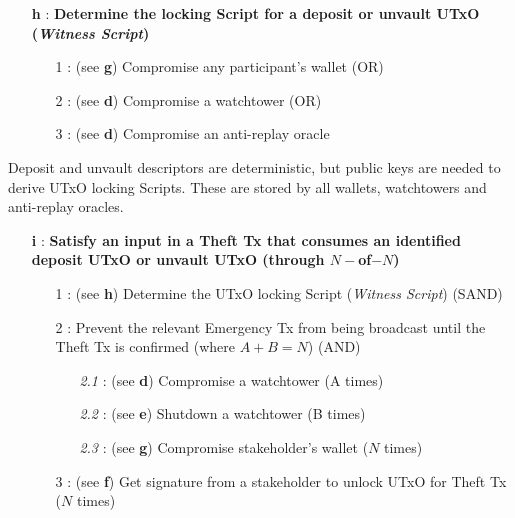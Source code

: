 \documentclass[runningheads]{llncs}
\begin{document}
{\footnotesize
\begin{itemize}[noitemsep,parsep=0pt,partopsep=0pt, leftmargin=0.7cm]
\item[\textbf{h} :] \textbf{Determine the locking Script for a deposit or unvault UTxO (\textit{Witness Script})}
\begin{itemize}[noitemsep,topsep=0pt,parsep=0pt,partopsep=0pt, leftmargin=0.8cm]
\item[1 :] (see \textbf{g}) Compromise any participant's wallet (OR)
\item[2 :] (see \textbf{d}) Compromise a watchtower (OR)
\item[3 :] (see \textbf{d}) Compromise an anti-replay oracle
\end{itemize}
\end{itemize}
}

\noindent Deposit and unvault descriptors are deterministic, but public keys are needed to derive UTxO locking Scripts. These are stored by all wallets, watchtowers and anti-replay oracles.

{\footnotesize
\begin{itemize}[noitemsep,parsep=0pt,partopsep=0pt, leftmargin=0.7cm]
\item[\textbf{i} :] \textbf{Satisfy an input in a Theft Tx that consumes an identified deposit UTxO or unvault UTxO (through $N-$of$-N$)}
\begin{itemize}[noitemsep,topsep=0pt,parsep=0pt,partopsep=0pt, leftmargin=0.8cm]
\item[1 :] (see \textbf{h}) Determine the UTxO locking Script (\textit{Witness Script}) (SAND)
\item[2 :] Prevent the relevant Emergency Tx from being broadcast until the Theft Tx is confirmed (where $A + B = N$) (AND)
\begin{itemize}[noitemsep,topsep=0pt,parsep=0pt,partopsep=0pt, leftmargin=0.9cm]
\item[\textit{2.1} :] (see \textbf{d}) Compromise a watchtower (A times)
\item[\textit{2.2} :] (see \textbf{e}) Shutdown a watchtower (B times)
\item[\textit{2.3} :] (see \textbf{g}) Compromise stakeholder's wallet ($N$ times)
\end{itemize}
\item[3 :] (see \textbf{f}) Get signature from a stakeholder to unlock UTxO for Theft Tx ($N$ times)
\end{itemize}
\end{itemize}
}
\end{document}
